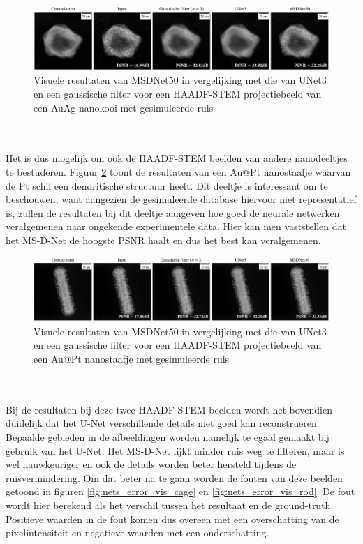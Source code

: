 \documentclass{report}
\begin{document}
\begin{figure}[h!]
	\centering
	\includegraphics[width=15cm]{images/nets/net_vis_cage.png}
	\caption{Visuele resultaten van MSDNet50 in vergelijking met die van UNet3 en een gaussische filter voor een HAADF-STEM projectiebeeld van een AuAg nanokooi met gesimuleerde ruis}
	\label{fig:nets_net_vis_cage}
\end{figure}
\\ \\
Het is dus mogelijk om ook de HAADF-STEM beelden van andere nanodeeltjes te bestuderen. Figuur \ref{fig:nets_net_vis_rod} toont de resultaten van een Au@Pt nanostaafje waarvan de Pt schil een dendritische structuur heeft. Dit deeltje is interessant om te beschouwen, want aangezien de gesimuleerde database hiervoor niet representatief is, zullen de resultaten bij dit deeltje aangeven hoe goed de neurale netwerken veralgemenen naar ongekende experimentele data. Hier kan men vaststellen dat het MS-D-Net de hoogste PSNR haalt en dus het best kan veralgemenen.
\begin{figure}[h!]
	\centering
	\includegraphics[width=15cm]{images/nets/net_vis_rod.png}
	\caption{Visuele resultaten van MSDNet50 in vergelijking met die van UNet3 en een gaussische filter voor een HAADF-STEM projectiebeeld van een Au@Pt nanostaafje met gesimuleerde ruis}
	\label{fig:nets_net_vis_rod}
\end{figure}
\\ \\
Bij de resultaten bij deze twee HAADF-STEM beelden wordt het bovendien duidelijk dat het U-Net verschillende details niet goed kan reconstrueren. Bepaalde gebieden in de afbeeldingen worden namelijk te egaal gemaakt bij gebruik van het U-Net. Het MS-D-Net lijkt minder ruis weg te filteren, maar is wel nauwkeuriger en ook de details worden beter hersteld tijdens de ruisvermindering. Om dat beter na te gaan worden de fouten van deze beelden getoond in figuren \ref{fig:nets_error_vis_cage} en \ref{fig:nets_error_vis_rod}. De fout wordt hier berekend als het verschil tussen het resultaat en de ground-truth. Positieve waarden in de fout komen dus overeen met een overschatting van de pixelintensiteit en negatieve waarden met een onderschatting.
\end{document}
